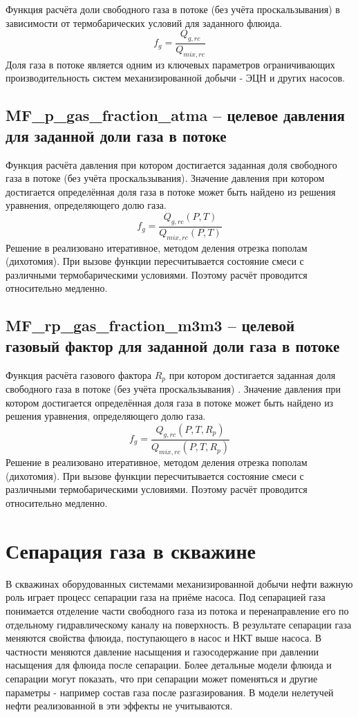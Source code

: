 Функция расчёта доли свободного газа в потоке (без учёта проскальзывания) в зависимости от термобарических условий для заданного флюида. 
$$f_g = \frac{Q_{g,rc}}{Q_{mix,rc}} $$
Доля газа в потоке является одним из ключевых параметров ограничивающих производительность систем механизированной добычи - ЭЦН и других насосов.


\subsection{MF\_p\_gas\_fraction\_atma – целевое давления для заданной доли газа в потоке}
Функция расчёта давления при котором достигается заданная доля свободного газа в потоке (без учёта проскальзывания). 
Значение давления при котором достигается определённая доля газа в потоке может быть найдено из решения уравнения, определяющего долю газа. 
$$f_g = \frac{Q_{g,rc}(P,T)}{Q_{mix,rc}(P,T)} $$
Решение в \unf реализовано итеративное, методом деления отрезка пополам (дихотомия). При вызове функции пересчитывается состояние смеси с различными термобарическими условиями. Поэтому расчёт проводится относительно медленно. 


\subsection{MF\_rp\_gas\_fraction\_m3m3 – целевой газовый фактор для заданной доли газа в потоке}
Функция расчёта газового фактора $R_p$ при котором достигается заданная доля свободного газа в потоке (без учёта проскальзывания) . 
Значение давления при котором достигается определённая доля газа в потоке может быть найдено из решения уравнения, определяющего долю газа. 
$$f_g = \frac{Q_{g,rc}(P,T,R_p)}{Q_{mix,rc}(P,T,R_p)} $$
Решение в \unf реализовано итеративное, методом деления отрезка пополам (дихотомия). При вызове функции пересчитывается состояние смеси с различными термобарическими условиями. Поэтому расчёт проводится относительно медленно. 


\section{Сепарация газа в скважине}
В скважинах оборудованных системами механизированной добычи нефти важную роль играет процесс сепарации газа на приёме насоса. Под сепарацией газа понимается отделение части свободного газа из потока и перенаправление его по отдельному гидравлическому каналу на поверхность. В результате сепарации газа меняются свойства флюида, поступающего в насос и НКТ выше насоса. В частности меняются давление насыщения и газосодержание при давлении насыщения для флюида после сепарации. Более детальные модели флюида и сепарации могут показать, что при сепарации может поменяться и другие параметры - например состав газа после разгазирования. В модели нелетучей нефти реализованной в \unf{} эти эффекты не учитываются.

